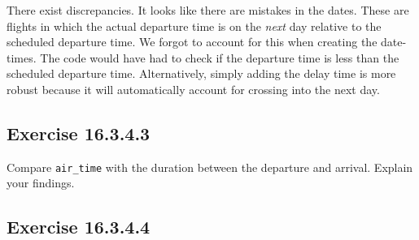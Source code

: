 \documentclass[]{book}
\newenvironment{Shaded}{\begin{snugshade}}{\end{snugshade}}
\newcommand{\CommentTok}[1]{\textcolor[rgb]{0.56,0.35,0.01}{\textit{#1}}}
\newcommand{\DataTypeTok}[1]{\textcolor[rgb]{0.13,0.29,0.53}{#1}}
\newcommand{\KeywordTok}[1]{\textcolor[rgb]{0.13,0.29,0.53}{\textbf{#1}}}
\newcommand{\NormalTok}[1]{#1}
\newcommand{\OperatorTok}[1]{\textcolor[rgb]{0.81,0.36,0.00}{\textbf{#1}}}
\newcommand{\StringTok}[1]{\textcolor[rgb]{0.31,0.60,0.02}{#1}}
\theoremstyle{plain}
\theoremstyle{remark}
\begin{document}
There exist discrepancies. It looks like there are mistakes in the
dates. These are flights in which the actual departure time is on the
\emph{next} day relative to the scheduled departure time. We forgot to
account for this when creating the date-times. The code would have had
to check if the departure time is less than the scheduled departure
time. Alternatively, simply adding the delay time is more robust because
it will automatically account for crossing into the next day.

\hypertarget{exercise-16.3.4.3}{%
\subsection*{\texorpdfstring{Exercise
{16.3.4.3}}{Exercise 16.3.4.3}}\label{exercise-16.3.4.3}}

Compare \texttt{air\_time} with the duration between the departure and
arrival. Explain your findings.

\begin{Shaded}
\end{Shaded}

\hypertarget{exercise-16.3.4.4}{%
\subsection*{\texorpdfstring{Exercise
{16.3.4.4}}{Exercise 16.3.4.4}}\label{exercise-16.3.4.4}}
\end{document}
